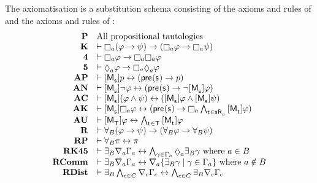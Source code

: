 \pagebreak

\begin{definition}\label{raml-k45-axiomatisation}
The axiomatisation \axiomRamlKFF{} is a substitution schema consisting of the axioms and rules of \axiomAmlKFF{} and the axioms and rules of \axiomRmlKFF{}:
$$
\begin{array}{rl}
    {\bf P}     & \text{All propositional tautologies}\\
    {\bf K}     & \proves \necessaryA (\phi \implies \psi) \implies (\necessaryA \phi \implies \necessaryA \psi)\\
    {\bf 4}     & \proves \necessaryA \phi \implies \necessaryA \necessaryA \phi\\
    {\bf 5}     & \proves \possibleA \phi \implies \necessaryA \possibleA \phi\\
    {\bf AP} & \proves \actionA{\aPModel{\aStateS}} \atomP \iff (\aPrecondition(\aStateS) \implies \atomP)\\
    {\bf AN} & \proves \actionA{\aPModel{\aStateS}} \lnot \phi \iff (\aPrecondition(\aStateS) \implies \lnot \actionA{\aPModel{\aStateS}} \phi)\\
    {\bf AC} & \proves \actionA{\aPModel{\aStateS}} (\phi \land \psi) \iff (\actionA{\aPModel{\aStateS}} \phi \land \actionA{\aPModel{\aStateS}} \psi)\\
    {\bf AK} & \proves \actionA{\aPModel{\aStateS}} \necessaryA \phi \iff (\aPrecondition(\aStateS) \implies \necessaryA \bigwedge_{\aStateT \in \aSuccessorsA{\aStateS}} \actionA{\aPModel{\aStateT}} \phi)\\
    {\bf AU} & \proves \actionA{\aPModel{\aStatesT}} \phi \iff \bigwedge_{\aStateT \in \aStatesT} \actionA{\aPModel{\aStateT}} \phi\\
    {\bf R} & \proves \allrefsBs (\phi \implies \psi) \implies (\allrefsBs \phi \implies \allrefsBs \psi)\\
    {\bf RP} & \proves \allrefsBs \pi \iff \pi\\
    {\bf RK45} & \proves \somerefsBs \coversA \Gamma_\agentA \iff \bigwedge_{\gamma \in \Gamma_\agentA} \possibleA \somerefsBs \gamma \text{ where } \agentA \in \agentsB\\
    {\bf RComm} & \proves \somerefsBs \coversA \Gamma_\agentA \iff \coversA \{\somerefsBs \gamma \mid \gamma \in \Gamma_\agentA\} \text{ where } \agentA \notin \agentsB\\
    {\bf RDist} & \proves \somerefsBs \bigwedge_{\agentC \in \agentsC} \coversC \Gamma_\agentC \iff \bigwedge_{\agentC \in \agentsC} \somerefsBs \coversC \Gamma_\agentC\\

\end{array}$$
\end{definition}
